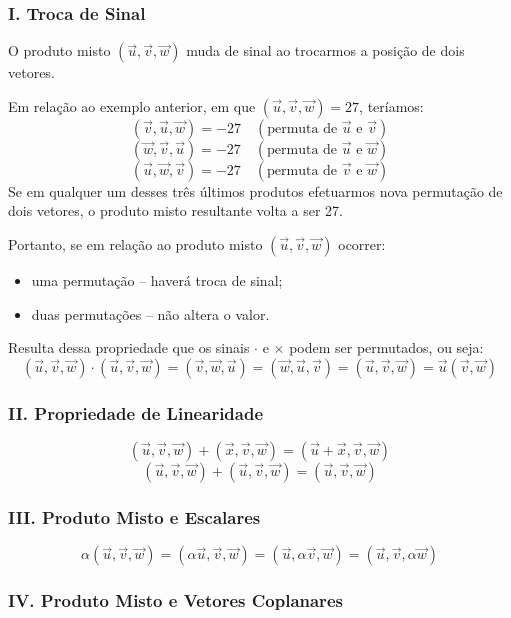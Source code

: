 \subsubsection*{I. Troca de Sinal}

O produto misto $(\vec{u}, \vec{v}, \vec{w})$ muda de sinal ao trocarmos a
posição de dois vetores.

Em relação ao exemplo anterior, em que $(\vec{u}, \vec{v}, \vec{w}) = 27$,
teríamos:
\[
  (\vec{v}, \vec{u}, \vec{w}) = -27 \quad (\text{permuta de } \vec{u} \text{ e } \vec{v})
\]
\[
  (\vec{w}, \vec{v}, \vec{u}) = -27 \quad (\text{permuta de } \vec{u} \text{ e } \vec{w})
\]
\[
  (\vec{u}, \vec{w}, \vec{v}) = -27 \quad (\text{permuta de } \vec{v} \text{ e } \vec{w})
\]
Se em qualquer um desses três últimos produtos efetuarmos nova permutação de
dois vetores, o produto misto resultante volta a ser 27.

Portanto, se em relação ao produto misto $(\vec{u}, \vec{v}, \vec{w})$ ocorrer:
\begin{itemize}
  \item uma permutação – haverá troca de sinal;
  \item duas permutações – não altera o valor.
\end{itemize}

Resulta dessa propriedade que os sinais $\cdot$ e $\times$ podem ser permutados,
ou seja:
\[
  (\vec{u}, \vec{v}, \vec{w}) \cdot (\vec{u}, \vec{v}, \vec{w}) = (\vec{v}, \vec{w}, \vec{u}) = (\vec{w}, \vec{u}, \vec{v}) = (\vec{u}, \vec{v}, \vec{w}) = \vec{u} (\vec{v}, \vec{w}) 
\]

\subsubsection*{II. Propriedade de Linearidade}

\[
  (\vec{u}, \vec{v}, \vec{w}) + (\vec{x}, \vec{v}, \vec{w}) = (\vec{u} + \vec{x}, \vec{v}, \vec{w})
\]
\[
  (\vec{u}, \vec{v}, \vec{w}) + (\vec{u}, \vec{v}, \vec{w}) = (\vec{u}, \vec{v}, \vec{w})
\]

\subsubsection*{III. Produto Misto e Escalares}

\[
  \alpha (\vec{u}, \vec{v}, \vec{w}) = (\alpha \vec{u}, \vec{v}, \vec{w}) = (\vec{u}, \alpha \vec{v}, \vec{w}) = (\vec{u}, \vec{v}, \alpha \vec{w})
\]

\subsubsection*{IV. Produto Misto e Vetores Coplanares}

